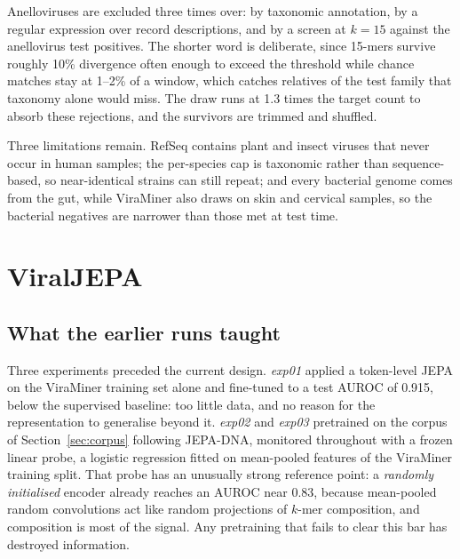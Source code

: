 \documentclass[10pt,twocolumn,a4paper]{article}
\begin{document}
Anelloviruses are excluded three times over: by taxonomic annotation, by a
regular expression over record descriptions, and by a screen at $k=15$ against
the anellovirus test positives. The shorter word is deliberate, since 15-mers
survive roughly 10\% divergence often enough to exceed the threshold while chance
matches stay at 1--2\% of a window, which catches relatives of the test family
that taxonomy alone would miss. The draw runs at 1.3 times the target count to
absorb these rejections, and the survivors are trimmed and shuffled.

Three limitations remain. RefSeq contains plant and insect viruses that never
occur in human samples; the per-species cap is taxonomic rather than
sequence-based, so near-identical strains can still repeat; and every bacterial
genome comes from the gut, while ViraMiner also draws on skin and cervical
samples, so the bacterial negatives are narrower than those met at test time.

\section{ViralJEPA}\label{sec:method}

\subsection{What the earlier runs taught}\label{sec:lessons}

Three experiments preceded the current design. \emph{exp01} applied a token-level
JEPA on the ViraMiner training set alone and fine-tuned to a test AUROC of 0.915,
below the supervised baseline: too little data, and no reason for the
representation to generalise beyond it. \emph{exp02} and \emph{exp03} pretrained
on the corpus of Section~\ref{sec:corpus} following JEPA-DNA, monitored
throughout with a frozen linear probe, a logistic regression fitted on
mean-pooled features of the ViraMiner training split. That probe has an unusually
strong reference point: a \emph{randomly initialised} encoder already reaches an
AUROC near 0.83, because mean-pooled random convolutions act like random
projections of $k$-mer composition, and composition is most of the signal. Any
pretraining that fails to clear this bar has destroyed information.
\end{document}
